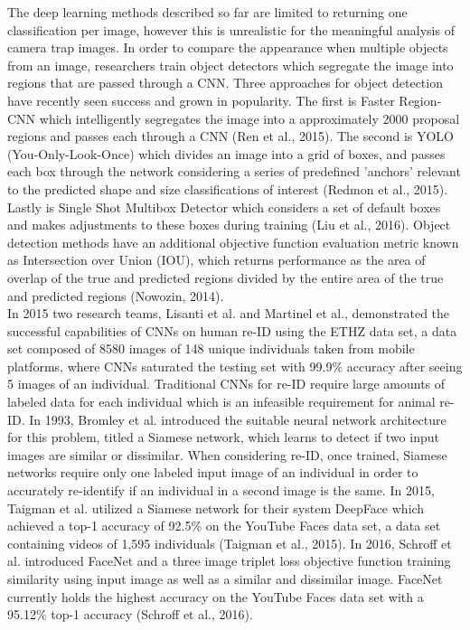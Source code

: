 \documentclass[11pt]{article}
\begin{document}
The deep learning methods described so far are limited to returning one classification per image, however this is unrealistic for the meaningful analysis of camera trap images. In order to compare the appearance when multiple objects from an image, researchers train object detectors which segregate the image into regions that are passed through a CNN. Three approaches for object detection have recently seen success and grown in popularity. The first is Faster Region-CNN which intelligently segregates the image into a approximately 2000 proposal regions and passes each through a CNN (Ren et al., 2015). The second is YOLO (You-Only-Look-Once) which divides an image into a grid of boxes, and passes each box through the network considering a series of predefined 'anchors' relevant to the predicted shape and size classifications of interest (Redmon et al., 2015). Lastly is Single Shot Multibox Detector which considers a set of default boxes and makes adjustments to these boxes during training (Liu et al., 2016). Object detection methods have an additional objective function evaluation metric known as Intersection over Union (IOU), which returns performance as the area of overlap of the true and predicted regions divided by the entire area of the true and predicted regions (Nowozin, 2014).
\newline
\\
In 2015 two research teams, Lisanti et al. and Martinel et al., demonstrated the successful capabilities of CNNs on human re-ID using the ETHZ data set, a data set composed of 8580 images of 148 unique individuals taken from mobile platforms, where CNNs saturated the testing set with 99.9\% accuracy after seeing 5 images of an individual. Traditional CNNs for re-ID require large amounts of labeled data for each individual which is an infeasible requirement for animal re-ID. In 1993, Bromley et al. introduced the suitable neural network architecture for this problem, titled a Siamese network, which learns to detect if two input images are similar or dissimilar. When considering re-ID, once trained, Siamese networks require only one labeled input image of an individual in order to accurately re-identify if an individual in a second image is the same. In 2015, Taigman et al. utilized a Siamese network for their system DeepFace which achieved a top-1 accuracy of 92.5\% on the YouTube Faces data set, a data set containing videos of 1,595 individuals (Taigman et al., 2015). In 2016, Schroff et al. introduced FaceNet and a three image triplet loss objective function training similarity using input image as well as a similar and dissimilar image. FaceNet currently holds the highest accuracy on the YouTube Faces data set with a 95.12\% top-1 accuracy (Schroff et al., 2016).
\newline
\end{document}
